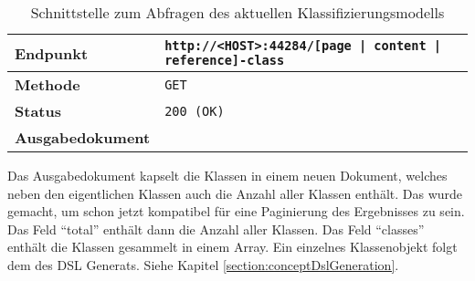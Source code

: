     \begin{table}[htb]
        \centering
        \begin{tabular}{|l|l|}
        \hline
        \textbf{Endpunkt} & \texttt{http://<HOST>:44284/[page | content | reference]-class}\\
        \hline
        \textbf{Methode} & \texttt{GET}\\
        \hline
        \textbf{Status} & \texttt{200 (OK)}\\
        \hline
        \textbf{Ausgabedokument} & \\
        \hline
        \end{tabular}
        \caption{Schnittstelle zum Abfragen des aktuellen Klassifizierungsmodells}
        \label{table:startClassificationInterface}
    \end{table}

    Das Ausgabedokument kapselt die Klassen in einem neuen Dokument,
    welches neben den eigentlichen Klassen auch die Anzahl aller Klassen enthält.
    Das wurde gemacht, um schon jetzt kompatibel für eine Paginierung des Ergebnisses zu sein.
    Das Feld "`total"' enthält dann die Anzahl aller Klassen.
    Das Feld "`classes"' enthält die Klassen gesammelt in einem Array.
    Ein einzelnes Klassenobjekt folgt dem des DSL Generats.
    Siehe Kapitel \ref{section:conceptDslGeneration}.